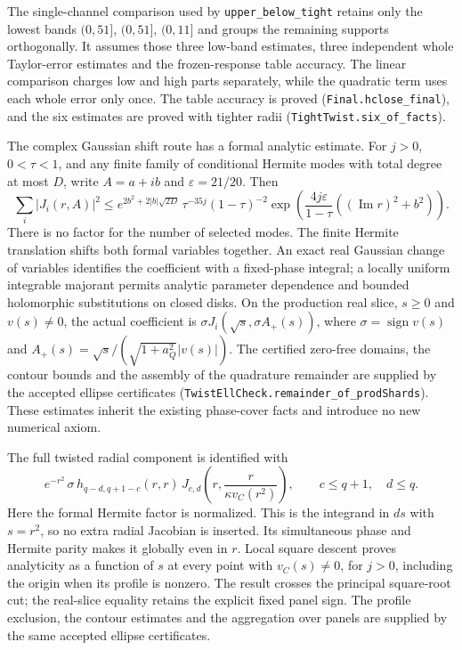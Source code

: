 \documentclass[11pt,a4paper]{article}
\newcommand{\lean}[1]{\texttt{\small #1}}
\begin{document}
The single-channel comparison used by \lean{upper\_below\_tight} retains only
the lowest bands $(0,51]$, $(0,51]$, $(0,11]$ and groups the remaining supports
orthogonally. It assumes those three low-band estimates, three independent
whole Taylor-error estimates and the frozen-response table accuracy. The linear
comparison charges low and high parts separately, while the quadratic term uses
each whole error only once. The table accuracy is proved (\lean{Final.hclose\_final}),
and the six estimates are proved with tighter radii (\lean{TightTwist.six\_of\_facts}).

The complex Gaussian shift route has a formal analytic estimate. For
$j>0$, $0<\tau<1$, and any finite family of conditional Hermite modes with
total degree at most $D$, write $A=a+ib$ and $\varepsilon=21/20$. Then
\[
 \sum_i |J_i(r,A)|^2 \le
 e^{2b^2+2|b|\sqrt{2D}}\,
 \tau^{-35j}(1-\tau)^{-2}
 \exp\!\left(\frac{4j\varepsilon}{1-\tau}
              ((\operatorname{Im}r)^2+b^2)\right).
\]
There is no factor for the number of selected modes. The finite Hermite
translation shifts both formal variables together. An exact real Gaussian
change of variables identifies the coefficient with a fixed-phase integral;
a locally uniform integrable majorant permits analytic parameter dependence
and bounded holomorphic substitutions on closed disks. On the production
real slice, $s\ge0$ and $v(s)\ne0$, the actual coefficient is
$\sigma J_i(\sqrt{s},\sigma A_+(s))$, where
$\sigma=\operatorname{sign}v(s)$ and
$A_+(s)=\sqrt{s}/(\sqrt{1+a_Q^2}|v(s)|)$.
The certified zero-free domains, the contour bounds and the assembly of the
quadrature remainder are supplied by the accepted ellipse certificates
(\lean{TwistEllCheck.remainder\_of\_prodShards}).
These estimates inherit the existing phase-cover facts and introduce no new
numerical axiom.

The full twisted radial component is identified with
\[
 e^{-r^2}\,\sigma\,
 h_{q-d,q+1-c}(r,r)\,
 J_{c,d}\!\left(r,\frac{r}{\kappa v_C(r^2)}\right),
 \qquad c\le q+1,\quad d\le q.
\]
Here the formal Hermite factor is normalized. This is the integrand in
$ds$ with $s=r^2$, so no extra radial Jacobian is inserted. Its simultaneous
phase and Hermite parity makes it globally even in $r$. Local square
descent proves analyticity as a function of $s$ at every point with
$v_C(s)\ne0$, for $j>0$, including the origin when its profile is nonzero.
The result crosses the principal square-root cut; the real-slice equality
retains the explicit fixed panel sign. The profile exclusion, the contour
estimates and the aggregation over panels are supplied by the same accepted
ellipse certificates.
\end{document}
